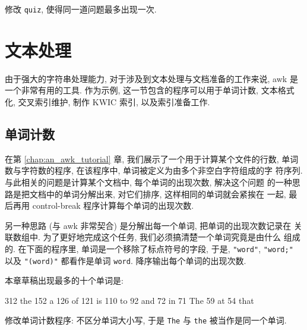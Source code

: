 \begin{exercise}
    \label{exer:quiz}
    修改 \texttt{quiz}, 使得同一道问题最多出现一次.
\end{exercise}

\section{文本处理}
\label{sec:text_processing}

由于强大的字符串处理能力, 对于涉及到文本处理与文档准备的工作来说, awk 是
一个非常有用的工具. 作为示例, 这一节包含的程序可以用于单词计数, 文本格式
化, 交叉索引维护, 制作 KWIC 索引, 以及索引准备工作.

\subsection{单词计数}
\label{subsec:word_counts}

在第 \ref{chap:an_awk_tutorial} 章, 我们展示了一个用于计算某个文件的行数,
单词数与字符数的程序, 在该程序中, 单词被定义为由多个非空白字符组成的字
符序列. 与此相关的问题是计算某个文档中, 每个单词的出现次数, 解决这个问题
的一种思路是把文档中的单词分解出来, 对它们排序, 这样相同的单词就会紧挨在
一起, 最后再用 control-break 程序计算每个单词的出现次数.

另一种思路 (与 awk 非常契合) 是分解出每一个单词, 把单词的出现次数记录在
关联数组中. 为了更好地完成这个任务, 我们必须搞清楚一个单词究竟是由什么
组成的. 在下面的程序里, 单词是一个移除了标点符号的字段, 于是,
\texttt{"word"}, \texttt{"word;"} 以及 \texttt{"(word)"} 都看作是单词
\texttt{word}. \END 降序输出每个单词的出现次数.
本章草稿出现最多的十个单词是:
\begin{awkcode}
    312 the     152 a       126 of      121 is      110 to
    92 and      72 in       71 The      59 at       54 that
\end{awkcode}

\begin{exercise}
    \label{exer:wordcount}
    修改单词计数程序: 不区分单词大小写, 于是 \texttt{The} 与
    \texttt{the} 被当作是同一个单词.
\end{exercise}

